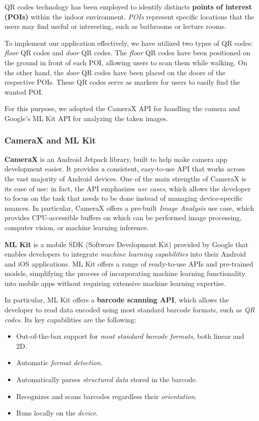 QR codes technology has been employed to identify distincts \textbf{points of interest (POIs)} within the indoor environment. \textit{POIs} represent specific locations that the users may find useful or interesting, such as bathrooms or lecture rooms.

To implement our application effectively, we have utilized two types of QR codes: \textit{floor} QR codes and \textit{door} QR codes. The \textit{floor} QR codes have been positioned on the ground in front of each POI, allowing users to scan them while walking. On the other hand, the \textit{door} QR codes have been placed on the doors of the respective POIs. These QR codes serve as markers for users to easily find the wanted POI.

For this purpose, we adopted the CameraX API for handling the camera and Google's ML Kit API for analyzing the taken images.


\subsubsection{CameraX and ML Kit}

\textbf{CameraX} is an Android Jetpack library, built to help make camera app development easier. 
It provides a consistent, easy-to-use API that works across the vast majority of Android devices.\cite{android:camerax:overview}
One of the main strengths of CameraX is its ease of use: in fact, the API emphasizes \textit{use cases}, which allows the developer to focus on the task that needs to be done instead of managing device-specific nuances.\cite{android:camerax:analyze}
In particular, CameraX offers a pre-built \textit{Image Analysis} use case, which provides CPU-accessible buffers on which can be performed image processing, computer vision, or machine learning inference.\cite{android:camerax:analyze}

\textbf{ML Kit} is a mobile SDK (Software Development Kit) provided by Google that enables developers to integrate\textit{ machine learning capabilities} into their Android and iOS applications. 
ML Kit offers a range of ready-to-use APIs and pre-trained models, simplifying the process of incorporating machine learning functionality into mobile apps without requiring extensive machine learning expertise.\cite{android:mlkit:overview}

In particular, ML Kit offers a \textbf{barcode scanning API}, which allows the developer to read data encoded using most standard barcode formats, such as \textit{QR codes}.\cite{android:mlkit:barcode}
Its key capabilities are the following:
\begin{itemize}
    \item Out-of-the-box support for \textit{most standard barcode formats}, both linear and 2D.
    \item Automatic \textit{format detection}.
    \item Automatically parses \textit{structured data} stored in the barcode.
    \item Recognizes and scans barcodes regardless their \textit{orientation}.
    \item Runs locally on the \textit{device}.
\end{itemize}

